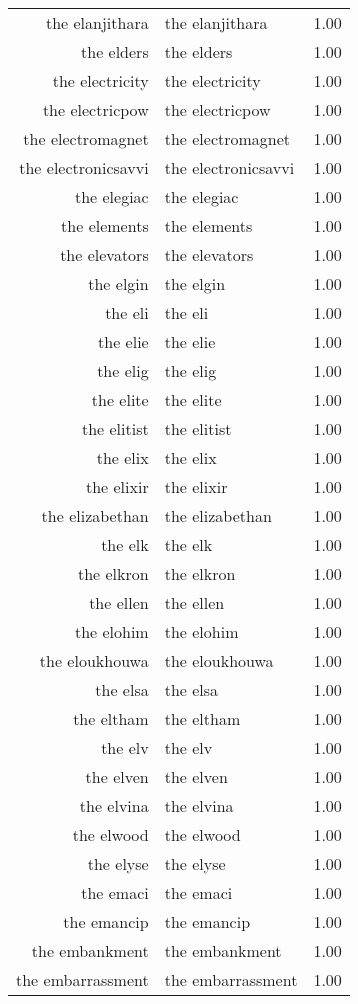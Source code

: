 \begin{table}[ht]
\begin{tabular}{rlr}
  the elanjithara & the elanjithara & 1.00 \\ 
  the elders & the elders & 1.00 \\ 
  the electricity & the electricity & 1.00 \\ 
  the electricpow & the electricpow & 1.00 \\ 
  the electromagnet & the electromagnet & 1.00 \\ 
  the electronicsavvi & the electronicsavvi & 1.00 \\ 
  the elegiac & the elegiac & 1.00 \\ 
  the elements & the elements & 1.00 \\ 
  the elevators & the elevators & 1.00 \\ 
  the elgin & the elgin & 1.00 \\ 
  the eli & the eli & 1.00 \\ 
  the elie & the elie & 1.00 \\ 
  the elig & the elig & 1.00 \\ 
  the elite & the elite & 1.00 \\ 
  the elitist & the elitist & 1.00 \\ 
  the elix & the elix & 1.00 \\ 
  the elixir & the elixir & 1.00 \\ 
  the elizabethan & the elizabethan & 1.00 \\ 
  the elk & the elk & 1.00 \\ 
  the elkron & the elkron & 1.00 \\ 
  the ellen & the ellen & 1.00 \\ 
  the elohim & the elohim & 1.00 \\ 
  the eloukhouwa & the eloukhouwa & 1.00 \\ 
  the elsa & the elsa & 1.00 \\ 
  the eltham & the eltham & 1.00 \\ 
  the elv & the elv & 1.00 \\ 
  the elven & the elven & 1.00 \\ 
  the elvina & the elvina & 1.00 \\ 
  the elwood & the elwood & 1.00 \\ 
  the elyse & the elyse & 1.00 \\ 
  the emaci & the emaci & 1.00 \\ 
  the emancip & the emancip & 1.00 \\ 
  the embankment & the embankment & 1.00 \\ 
  the embarrassment & the embarrassment & 1.00 \\ 

\end{tabular}
\end{table}
